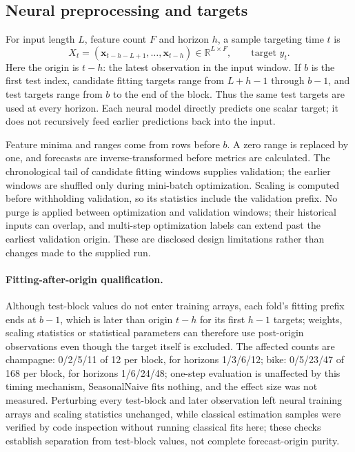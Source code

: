 \documentclass[10pt,a4paper]{article}
\begin{document}
\subsection{Neural preprocessing and targets}
For input length $L$, feature count $F$ and horizon $h$, a sample targeting time $t$ is
\[
X_t=(\mathbf{x}_{t-h-L+1},\ldots,\mathbf{x}_{t-h})\in\mathbb{R}^{L\times F},\qquad \text{target }y_t.
\]
Here the origin is $t-h$: the latest observation in the input window. If $b$ is the first test index, candidate fitting targets range from $L+h-1$ through $b-1$, and test targets range from $b$ to the end of the block. Thus the same test targets are used at every horizon. Each neural model directly predicts one scalar target; it does not recursively feed earlier predictions back into the input.

Feature minima and ranges come from rows before $b$. A zero range is replaced by one, and forecasts are inverse-transformed before metrics are calculated. The chronological tail of candidate fitting windows supplies validation; the earlier windows are shuffled only during mini-batch optimization. Scaling is computed before withholding validation, so its statistics include the validation prefix. No purge is applied between optimization and validation windows; their historical inputs can overlap, and multi-step optimization labels can extend past the earliest validation origin. These are disclosed design limitations rather than changes made to the supplied run.

\paragraph{Fitting-after-origin qualification.}
Although test-block values do not enter training arrays, each fold's fitting prefix ends at $b-1$, which is later than origin $t-h$ for its first $h-1$ targets; weights, scaling statistics or statistical parameters can therefore use post-origin observations even though the target itself is excluded. The affected counts are champagne: 0/2/5/11 of 12 per block, for horizons 1/3/6/12; bike: 0/5/23/47 of 168 per block, for horizons 1/6/24/48; one-step evaluation is unaffected by this timing mechanism, SeasonalNaive fits nothing, and the effect size was not measured. Perturbing every test-block and later observation left neural training arrays and scaling statistics unchanged, while classical estimation samples were verified by code inspection without running classical fits here; these checks establish separation from test-block values, not complete forecast-origin purity.
\end{document}
